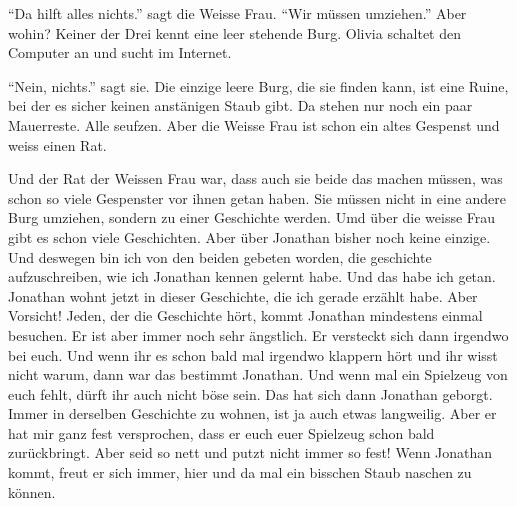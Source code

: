 \enquote{Da hilft alles nichts.} sagt die Weisse Frau. \enquote{Wir müssen umziehen.} Aber wohin? Keiner der Drei kennt eine leer stehende Burg. Olivia schaltet den Computer an und sucht im Internet.

\enquote{Nein, nichts.} sagt sie. Die einzige leere Burg, die sie finden kann, ist eine Ruine, bei der es sicher keinen anstänigen Staub gibt. Da stehen nur noch ein paar Mauerreste. Alle seufzen. Aber die Weisse Frau ist schon ein altes Gespenst und weiss einen Rat.

\medskip
\begin{mdframed}[style=mystyle]
Und der Rat der Weissen Frau war, dass auch sie beide das machen müssen, was schon so viele Gespenster vor ihnen getan haben. Sie müssen nicht in eine andere Burg umziehen, sondern zu einer Geschichte werden. Umd über die weisse Frau gibt es schon viele Geschichten. Aber über Jonathan bisher noch keine einzige. Und deswegen bin ich von den beiden gebeten worden, die geschichte aufzuschreiben, wie ich Jonathan kennen gelernt habe. Und das habe ich getan. Jonathan wohnt jetzt in dieser Geschichte, die ich gerade erzählt habe. Aber Vorsicht! Jeden, der die Geschichte hört, kommt Jonathan mindestens einmal besuchen. Er ist aber immer noch sehr ängstlich. Er versteckt sich dann irgendwo bei euch. Und wenn ihr es schon bald mal irgendwo klappern hört und ihr wisst nicht warum, dann war das bestimmt Jonathan. Und wenn mal ein Spielzeug von euch fehlt, dürft ihr auch nicht böse sein. Das hat sich dann Jonathan geborgt. Immer in derselben Geschichte zu wohnen, ist ja auch etwas langweilig. Aber er hat mir ganz fest versprochen, dass er euch euer Spielzeug schon bald zurückbringt. Aber seid so nett und putzt nicht immer so fest! Wenn Jonathan kommt, freut er sich immer, hier und da mal ein bisschen Staub naschen zu können.
\end{mdframed}\medskip


